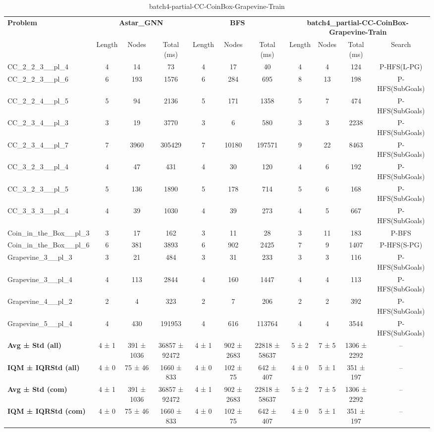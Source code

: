 \begin{table}[!ht]
\centering
\scriptsize
\begin{tabular}{l|ccc|ccc|cccc}
\multirow{2}{*}{\textbf{Problem}} & \multicolumn{3}{c|}{\textbf{Astar\_GNN}} & \multicolumn{3}{c|}{\textbf{BFS}} & \multicolumn{4}{c}{\textbf{batch4\_partial-CC-CoinBox-Grapevine-Train}} \\
\cline{2-11}
& Length & Nodes & Total (ms) & Length & Nodes & Total (ms) & Length & Nodes & Total (ms) & Search \\
\hline
CC\_2\_2\_3\_\_pl\_4 & 4 & 14 & 73 & 4 & 17 & 40 & 4 & 4 & 124 & P-HFS(L-PG) \\
CC\_2\_2\_3\_\_pl\_6 & 6 & 193 & 1576 & 6 & 284 & 695 & 8 & 13 & 198 & P-HFS(SubGoals) \\
CC\_2\_2\_4\_\_pl\_5 & 5 & 94 & 2136 & 5 & 171 & 1358 & 5 & 7 & 474 & P-HFS(SubGoals) \\
CC\_2\_3\_4\_\_pl\_3 & 3 & 19 & 3770 & 3 & 6 & 580 & 3 & 3 & 2238 & P-HFS(SubGoals) \\
CC\_2\_3\_4\_\_pl\_7 & 7 & 3960 & 305429 & 7 & 10180 & 197571 & 9 & 22 & 8463 & P-HFS(SubGoals) \\
CC\_3\_2\_3\_\_pl\_4 & 4 & 47 & 431 & 4 & 30 & 120 & 4 & 6 & 192 & P-HFS(SubGoals) \\
CC\_3\_2\_3\_\_pl\_5 & 5 & 136 & 1890 & 5 & 178 & 714 & 5 & 6 & 168 & P-HFS(SubGoals) \\
CC\_3\_3\_3\_\_pl\_4 & 4 & 39 & 1030 & 4 & 39 & 273 & 4 & 5 & 667 & P-HFS(SubGoals) \\
Coin\_in\_the\_Box\_\_pl\_3 & 3 & 17 & 162 & 3 & 11 & 28 & 3 & 11 & 183 & P-BFS \\
Coin\_in\_the\_Box\_\_pl\_6 & 6 & 381 & 3893 & 6 & 902 & 2425 & 7 & 9 & 1407 & P-HFS(S-PG) \\
Grapevine\_3\_\_pl\_3 & 3 & 21 & 484 & 3 & 31 & 233 & 3 & 3 & 116 & P-HFS(SubGoals) \\
Grapevine\_3\_\_pl\_4 & 4 & 113 & 2844 & 4 & 160 & 1447 & 4 & 4 & 113 & P-HFS(SubGoals) \\
Grapevine\_4\_\_pl\_2 & 2 & 4 & 323 & 2 & 7 & 206 & 2 & 2 & 392 & P-HFS(SubGoals) \\
Grapevine\_5\_\_pl\_4 & 4 & 430 & 191953 & 4 & 616 & 113764 & 4 & 4 & 3544 & P-HFS(SubGoals) \\
\hline
\textbf{Avg ± Std (all)} & 4 ± 1 & 391 ± 1036 & 36857 ± 92472 & 4 ± 1 & 902 ± 2683 & 22818 ± 58637 & 5 ± 2 & 7 ± 5 & 1306 ± 2292 & -- \\
\textbf{IQM ± IQRStd (all)} & 4 ± 0 & 75 ± 46 & 1660 ± 833 & 4 ± 0 & 102 ± 75 & 642 ± 407 & 4 ± 0 & 5 ± 1 & 351 ± 197 & -- \\
\textbf{Avg ± Std (com)} & 4 ± 1 & 391 ± 1036 & 36857 ± 92472 & 4 ± 1 & 902 ± 2683 & 22818 ± 58637 & 5 ± 2 & 7 ± 5 & 1306 ± 2292 & -- \\
\textbf{IQM ± IQRStd (com)} & 4 ± 0 & 75 ± 46 & 1660 ± 833 & 4 ± 0 & 102 ± 75 & 642 ± 407 & 4 ± 0 & 5 ± 1 & 351 ± 197 & -- \\
\end{tabular}
\caption{batch4-partial-CC-CoinBox-Grapevine-Train}
\label{tab:batch4_partial_CC-CoinBox-Grapevine_comparison_train}
\end{table}

